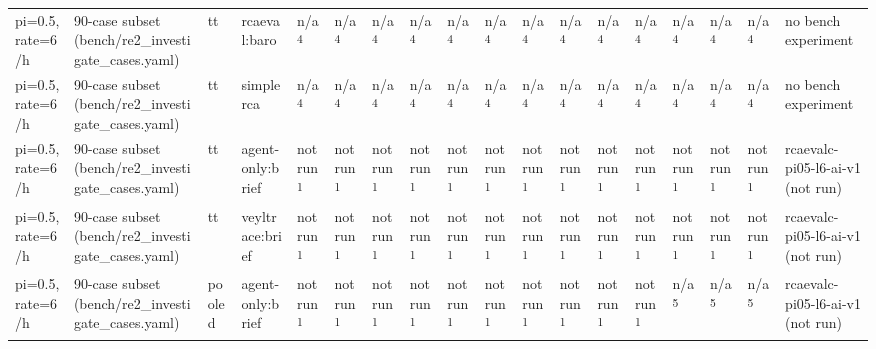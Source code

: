\begin{table}[t]
\begin{tabular}{llllllllllllllllll}
pi=0.5, rate=6/h & 90-case subset (bench/re2\_investigate\_cases.yaml) & tt & rcaeval:baro & n/a\textsuperscript{4} & n/a\textsuperscript{4} & n/a\textsuperscript{4} & n/a\textsuperscript{4} & n/a\textsuperscript{4} & n/a\textsuperscript{4} & n/a\textsuperscript{4} & n/a\textsuperscript{4} & n/a\textsuperscript{4} & n/a\textsuperscript{4} & n/a\textsuperscript{4} & n/a\textsuperscript{4} & n/a\textsuperscript{4} & no bench experiment \\
pi=0.5, rate=6/h & 90-case subset (bench/re2\_investigate\_cases.yaml) & tt & simplerca & n/a\textsuperscript{4} & n/a\textsuperscript{4} & n/a\textsuperscript{4} & n/a\textsuperscript{4} & n/a\textsuperscript{4} & n/a\textsuperscript{4} & n/a\textsuperscript{4} & n/a\textsuperscript{4} & n/a\textsuperscript{4} & n/a\textsuperscript{4} & n/a\textsuperscript{4} & n/a\textsuperscript{4} & n/a\textsuperscript{4} & no bench experiment \\
pi=0.5, rate=6/h & 90-case subset (bench/re2\_investigate\_cases.yaml) & tt & agent-only:brief & not run\textsuperscript{1} & not run\textsuperscript{1} & not run\textsuperscript{1} & not run\textsuperscript{1} & not run\textsuperscript{1} & not run\textsuperscript{1} & not run\textsuperscript{1} & not run\textsuperscript{1} & not run\textsuperscript{1} & not run\textsuperscript{1} & not run\textsuperscript{1} & not run\textsuperscript{1} & not run\textsuperscript{1} & rcaevalc-pi05-l6-ai-v1 (not run) \\
pi=0.5, rate=6/h & 90-case subset (bench/re2\_investigate\_cases.yaml) & tt & veyltrace:brief & not run\textsuperscript{1} & not run\textsuperscript{1} & not run\textsuperscript{1} & not run\textsuperscript{1} & not run\textsuperscript{1} & not run\textsuperscript{1} & not run\textsuperscript{1} & not run\textsuperscript{1} & not run\textsuperscript{1} & not run\textsuperscript{1} & not run\textsuperscript{1} & not run\textsuperscript{1} & not run\textsuperscript{1} & rcaevalc-pi05-l6-ai-v1 (not run) \\
pi=0.5, rate=6/h & 90-case subset (bench/re2\_investigate\_cases.yaml) & pooled & agent-only:brief & not run\textsuperscript{1} & not run\textsuperscript{1} & not run\textsuperscript{1} & not run\textsuperscript{1} & not run\textsuperscript{1} & not run\textsuperscript{1} & not run\textsuperscript{1} & not run\textsuperscript{1} & not run\textsuperscript{1} & not run\textsuperscript{1} & n/a\textsuperscript{5} & n/a\textsuperscript{5} & n/a\textsuperscript{5} & rcaevalc-pi05-l6-ai-v1 (not run) \\

\end{tabular}
\end{table}
